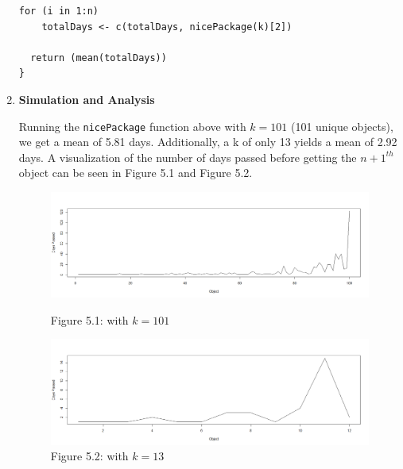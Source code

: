 \documentclass[12pt,letterpaper]{article}
\newcommand{\code}[1]{\colorbox{light-gray}{\texttt{#1}}}
\begin{document}
\begin{enumerate}[label=\Alph*]
\begin{lstlisting}[title=\footnotesize Code 5.2: \code{manyNicePackages} function]
  for (i in 1:n)
    totalDays <- c(totalDays, nicePackage(k)[2])
  
  return (mean(totalDays))
}
        \end{lstlisting}

        \item \textbf{Simulation and Analysis}

        Running the \code{nicePackage} function above with $k=101$ (101 unique objects), we get a mean of 5.81 days. Additionally, a k of only 13 yields a mean of 2.92 days. A visualization of the number of days passed before getting the $n+1^{th}$ object can be seen in Figure 5.1 and Figure 5.2.
        \begin{figure}[H]
          \centering
          \includegraphics*[scale=0.4]{fig5.1.png}
          \caption*{\footnotesize Figure 5.1: with $k=101$}

          \includegraphics*[scale=0.4]{fig5.2.png}
          \caption*{\footnotesize Figure 5.2: with $k=13$}
          
        \end{figure}


\end{enumerate}
\end{document}
